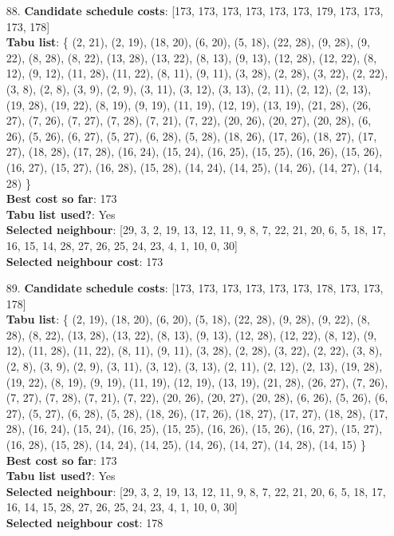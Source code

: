 \documentclass[fleqn]{article}
\begin{document}
\begin{itemize}
    \item[88.] \textbf{Candidate schedule costs}: [173, 173, 173, 173, 173, 173, 179, 173, 173, 173, 178] \\
    \textbf{Tabu list}: \{ (2, 21), (2, 19), (18, 20), (6, 20), (5, 18), (22, 28), (9, 28), (9, 22), (8, 28), (8, 22), (13, 28), (13, 22), (8, 13), (9, 13), (12, 28), (12, 22), (8, 12), (9, 12), (11, 28), (11, 22), (8, 11), (9, 11), (3, 28), (2, 28), (3, 22), (2, 22), (3, 8), (2, 8), (3, 9), (2, 9), (3, 11), (3, 12), (3, 13), (2, 11), (2, 12), (2, 13), (19, 28), (19, 22), (8, 19), (9, 19), (11, 19), (12, 19), (13, 19), (21, 28), (26, 27), (7, 26), (7, 27), (7, 28), (7, 21), (7, 22), (20, 26), (20, 27), (20, 28), (6, 26), (5, 26), (6, 27), (5, 27), (6, 28), (5, 28), (18, 26), (17, 26), (18, 27), (17, 27), (18, 28), (17, 28), (16, 24), (15, 24), (16, 25), (15, 25), (16, 26), (15, 26), (16, 27), (15, 27), (16, 28), (15, 28), (14, 24), (14, 25), (14, 26), (14, 27), (14, 28) \} \\
    \textbf{Best cost so far}: 173 \\
    \textbf{Tabu list used?}: Yes \\
    \textbf{Selected neighbour}: [29, 3, 2, 19, 13, 12, 11, 9, 8, 7, 22, 21, 20, 6, 5, 18, 17, 16, 15, 14, 28, 27, 26, 25, 24, 23, 4, 1, 10, 0, 30] \\
    \textbf{Selected neighbour cost}: 173
      

    \item[89.] \textbf{Candidate schedule costs}: [173, 173, 173, 173, 173, 173, 178, 173, 173, 178] \\
    \textbf{Tabu list}: \{ (2, 19), (18, 20), (6, 20), (5, 18), (22, 28), (9, 28), (9, 22), (8, 28), (8, 22), (13, 28), (13, 22), (8, 13), (9, 13), (12, 28), (12, 22), (8, 12), (9, 12), (11, 28), (11, 22), (8, 11), (9, 11), (3, 28), (2, 28), (3, 22), (2, 22), (3, 8), (2, 8), (3, 9), (2, 9), (3, 11), (3, 12), (3, 13), (2, 11), (2, 12), (2, 13), (19, 28), (19, 22), (8, 19), (9, 19), (11, 19), (12, 19), (13, 19), (21, 28), (26, 27), (7, 26), (7, 27), (7, 28), (7, 21), (7, 22), (20, 26), (20, 27), (20, 28), (6, 26), (5, 26), (6, 27), (5, 27), (6, 28), (5, 28), (18, 26), (17, 26), (18, 27), (17, 27), (18, 28), (17, 28), (16, 24), (15, 24), (16, 25), (15, 25), (16, 26), (15, 26), (16, 27), (15, 27), (16, 28), (15, 28), (14, 24), (14, 25), (14, 26), (14, 27), (14, 28), (14, 15) \} \\
    \textbf{Best cost so far}: 173 \\
    \textbf{Tabu list used?}: Yes \\
    \textbf{Selected neighbour}: [29, 3, 2, 19, 13, 12, 11, 9, 8, 7, 22, 21, 20, 6, 5, 18, 17, 16, 14, 15, 28, 27, 26, 25, 24, 23, 4, 1, 10, 0, 30] \\
    \textbf{Selected neighbour cost}: 178
      


\end{itemize}
\end{document}
